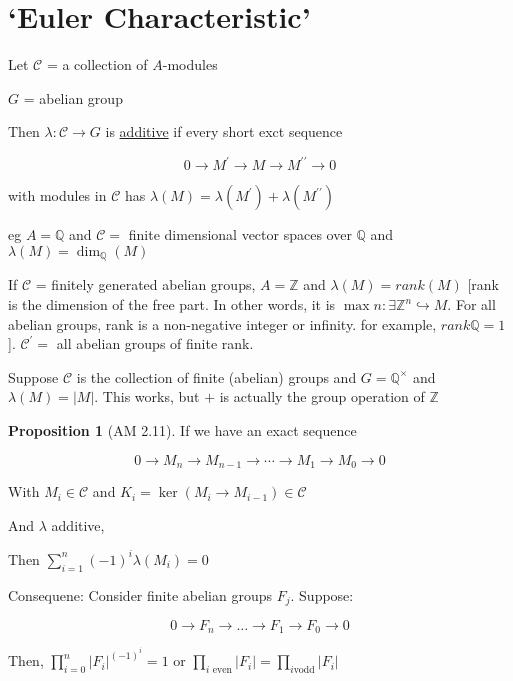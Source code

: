 \documentclass{article}
\theoremstyle{definition}
\newtheorem{proposition}{Proposition}
\begin{document}
\section*{`Euler Characteristic'}

Let \(\mathcal{C} \) = a collection of \(A\)-modules

\(G\) = abelian group

Then \(\lambda : \mathcal{C} \to G\) is \underline{additive} if every short exct sequence

\[
    0 \to M^{\prime} \to M \to M^{\prime\prime} \to 0
\]

with modules in \(\mathcal{C}\) has \(\lambda (M) = \lambda (M^{\prime} )+\lambda (M^{\prime\prime} )\) 

eg \(A = \mathbb{Q}\) and \(\mathcal{C} =\) finite dimensional vector spaces over \(\mathbb{Q}\) and \(\lambda(M)=\dim_\mathbb{Q} (M)\) 

If \(\mathcal{C}\) = finitely generated abelian groups, \(A = \mathbb{Z}\) and \(\lambda (M) = rank(M)\) [rank is the dimension of the free part. In other words, it is \(\max{n : \exists \mathbb{Z}^n \hookrightarrow M}\). For all abelian groups, rank is a non-negative integer or infinity. for example, \(rank \mathbb{Q} = 1\)]. \(\mathcal{C} ^{\prime} =\) all abelian groups of finite rank.

Suppose \(\mathcal{C} \) is the collection of finite (abelian) groups and \(G = \mathbb{Q} ^\times \) and \(\lambda (M) = \vert M \vert \). This works, but \(+\) is actually the group operation of \(\mathbb{Z}\) 

\begin{proposition}
    [AM 2.11] If we have an exact sequence

    \[
        0 \to M_n \to M_{n-1} \to \cdots \to M_1 \to M_0 \to 0
    \]

    With \(M_i\in \mathcal{C}\) and \(K_i = \ker (M_i \to M_{i-1})\in \mathcal{C}\) 

    And \(\lambda \) additive,

    Then \(\sum_{i=1}^{n} (-1)^i \lambda (M_i) = 0\) 

\end{proposition}

Consequene: Consider finite abelian groups \(F_j\). Suppose:

\[
    0 \to F_n \to \dots \to F_1 \to F_0 \to 0
\]

Then, \(\displaystyle \prod_{i=0}^{n} \vert F_i \vert ^{(-1)^i} = 1 \text{ or } \prod_{i\text{ even}}\vert F_i \vert = \prod_{i\text{vodd}}\vert F_i \vert \) 
\end{document}

